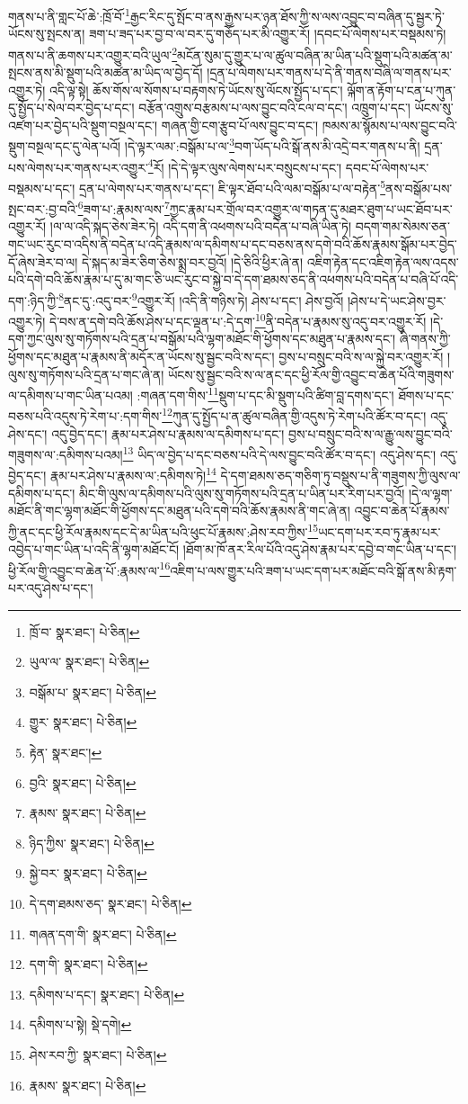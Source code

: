 གནས་པ་ནི་གླང་པོ་ཆེ་:ཁྲོ་བོ་\footnote{ཁྲོ་བ་  སྣར་ཐང་།  པེ་ཅིན། }རྒྱང་རིང་དུ་སྤོང་བ་ནས་རྒྱས་པར་ཉན་ཐོས་ཀྱི་ས་ལས་འབྱུང་བ་བཞིན་དུ་སྦྱར་ཏེ་ཡོངས་སུ་སྤངས་ན། ཟག་པ་ཟད་པར་བྱ་བ་ལ་བར་དུ་གཅོད་པར་མི་འགྱུར་རོ། །དབང་པོ་ལེགས་པར་བསྡམས་ཏེ། གནས་པ་ནི་ཆགས་པར་འགྱུར་བའི་ཡུལ་\footnote{ཡུལ་ལ་  སྣར་ཐང་།  པེ་ཅིན། }མངོན་སུམ་དུ་གྱུར་པ་ལ་ཚུལ་བཞིན་མ་ཡིན་པའི་སྡུག་པའི་མཚན་མ་སྤངས་ནས་མི་སྡུག་པའི་མཚན་མ་ཡིད་ལ་བྱེད་དོ། །དྲན་པ་ལེགས་པར་གནས་པ་དེ་ནི་གནས་བཞི་ལ་གནས་པར་འགྱུར་ཏེ། འདི་ལྟ་སྟེ། ཆོས་གོས་ལ་སོགས་པ་བརྟགས་ཏེ་ཡོངས་སུ་ལོངས་སྤྱོད་པ་དང་། ལྐོག་ན་རྟོག་པ་ངན་པ་ཀུན་དུ་སྤྱོད་པ་སེལ་བར་བྱེད་པ་དང་། བརྩོན་འགྲུས་བརྩམས་པ་ལས་བྱུང་བའི་ངལ་བ་དང་། འཁྲུག་པ་དང་། ཡོངས་སུ་འཛག་པར་བྱེད་པའི་སྡུག་བསྔལ་དང་། གཞན་གྱི་ངག་རྩུབ་པོ་ལས་བྱུང་བ་དང་། ཁམས་མ་སྙོམས་པ་ལས་བྱུང་བའི་སྡུག་བསྔལ་དང་དུ་ལེན་པའོ། །དེ་ལྟར་ལམ་:བསྒོམ་པ་ལ་\footnote{བསྒོམ་པ་  སྣར་ཐང་།  པེ་ཅིན། }བག་ཡོད་པའི་སྒོ་ནས་མི་འདྲེ་བར་གནས་པ་ནི། དྲན་པས་ལེགས་པར་གནས་པར་འགྱུར་\footnote{གྱུར་  སྣར་ཐང་།  པེ་ཅིན། }རོ། །དེ་དེ་ལྟར་ལུས་ལེགས་པར་བསྲུངས་པ་དང་། དབང་པོ་ལེགས་པར་བསྡམས་པ་དང་། དྲན་པ་ལེགས་པར་གནས་པ་དང་། ཇི་ལྟར་ཐོབ་པའི་ལམ་བསྒོམ་པ་ལ་བརྟེན་\footnote{རྟེན་  སྣར་ཐང་། }ནས་བསྒོམ་པས་སྤང་བར་:བྱ་བའི་\footnote{བྱའི་  སྣར་ཐང་།  པེ་ཅིན། }ཟག་པ་:རྣམས་ལས་\footnote{རྣམས་  སྣར་ཐང་།  པེ་ཅིན། }ཀྱང་རྣམ་པར་གྲོལ་བར་འགྱུར་ལ་གཏན་དུ་མཐར་ཐུག་པ་ཡང་ཐོབ་པར་འགྱུར་རོ། །ལ་ལ་འདི་སྐད་ཅེས་ཟེར་ཏེ། འདི་དག་ནི་འཕགས་པའི་བདེན་པ་བཞི་ཡིན་ཏེ། བདག་གམ་སེམས་ཅན་གང་ཡང་རུང་བ་འདིས་ནི་བདེན་པ་འདི་རྣམས་ལ་དམིགས་པ་དང་བཅས་ནས་དགེ་བའི་ཆོས་རྣམས་སྒོམ་པར་བྱེད་དོ་ཞེས་ཟེར་བ་ལ། དེ་སྐད་མ་ཟེར་ཅིག་ཅེས་སྨྲ་བར་བྱའོ། །དེ་ཅིའི་ཕྱིར་ཞེ་ན། འཇིག་རྟེན་དང་འཇིག་རྟེན་ལས་འདས་པའི་དགེ་བའི་ཆོས་རྣམ་པ་དུ་མ་གང་ཅི་ཡང་རུང་བ་སྐྱེ་བ་དེ་དག་ཐམས་ཅད་ནི་འཕགས་པའི་བདེན་པ་བཞི་པོ་འདི་དག་:ཉིད་ཀྱི་\footnote{ཉིད་ཀྱིས་  སྣར་ཐང་།  པེ་ཅིན། }ནང་དུ་:འདུ་བར་\footnote{སྐྱེ་བར་  སྣར་ཐང་།  པེ་ཅིན། }འགྱུར་རོ། །འདི་ནི་གཉིས་ཏེ། ཤེས་པ་དང་། ཤེས་བྱའོ། །ཤེས་པ་དེ་ཡང་ཤེས་བྱར་འགྱུར་ཏེ། དེ་བས་ན་དགེ་བའི་ཆོས་ཤེས་པ་དང་ལྡན་པ་:དེ་དག་\footnote{དེ་དག་ཐམས་ཅད་  སྣར་ཐང་།  པེ་ཅིན། }ནི་བདེན་པ་རྣམས་སུ་འདུ་བར་འགྱུར་རོ། །དེ་དག་ཀྱང་ལུས་སུ་གཏོགས་པའི་དྲན་པ་བསྒོམ་པའི་ལྷག་མཐོང་གི་ཕྱོགས་དང་མཐུན་པ་རྣམས་དང་། ཞི་གནས་ཀྱི་ཕྱོགས་དང་མཐུན་པ་རྣམས་ནི་མདོར་ན་ཡོངས་སུ་སྦྱང་བའི་ས་དང་། བྱས་པ་བསྲུང་བའི་ས་ལ་སྐྱེ་བར་འགྱུར་རོ། །ལུས་སུ་གཏོགས་པའི་དྲན་པ་གང་ཞེ་ན། ཡོངས་སུ་སྦྱང་བའི་ས་ལ་ནང་དང་ཕྱི་རོལ་གྱི་འབྱུང་བ་ཆེན་པོའི་གཟུགས་ལ་དམིགས་པ་གང་ཡིན་པའམ། :གཞན་དག་གིས་\footnote{གཞན་དག་གི་  སྣར་ཐང་།  པེ་ཅིན། }སྡུག་པ་དང་མི་སྡུག་པའི་ཚིག་བླ་དགས་དང་། ཐོགས་པ་དང་བཅས་པའི་འདུས་ཏེ་རེག་པ་:དག་གིས་\footnote{དག་གི་  སྣར་ཐང་།  པེ་ཅིན། }ཀུན་དུ་སྤྱོད་པ་ན་ཚུལ་བཞིན་གྱི་འདུས་ཏེ་རེག་པའི་ཚོར་བ་དང་། འདུ་ཤེས་དང་། འདུ་བྱེད་དང་། རྣམ་པར་ཤེས་པ་རྣམས་ལ་དམིགས་པ་དང་། བྱས་པ་བསྲུང་བའི་ས་ལ་རྒྱུ་ལས་བྱུང་བའི་གཟུགས་ལ་:དམིགས་པའམ།\footnote{དམིགས་པ་དང་།  སྣར་ཐང་།  པེ་ཅིན། } ཡིད་ལ་བྱེད་པ་དང་བཅས་པའི་དེ་ལས་བྱུང་བའི་ཚོར་བ་དང་། འདུ་ཤེས་དང་། འདུ་བྱེད་དང་། རྣམ་པར་ཤེས་པ་རྣམས་ལ་:དམིགས་ཏེ།\footnote{དམིགས་པ་སྟེ།  སྡེ་དགེ། } དེ་དག་ཐམས་ཅད་གཅིག་ཏུ་བསྡུས་པ་ནི་གཟུགས་ཀྱི་ལུས་ལ་དམིགས་པ་དང་། མིང་གི་ལུས་ལ་དམིགས་པའི་ལུས་སུ་གཏོགས་པའི་དྲན་པ་ཡིན་པར་རིག་པར་བྱའོ། །དེ་ལ་ལྷག་མཐོང་ནི་གང་ལྷག་མཐོང་གི་ཕྱོགས་དང་མཐུན་པའི་དགེ་བའི་ཆོས་རྣམས་ནི་གང་ཞེ་ན། འབྱུང་བ་ཆེན་པོ་རྣམས་ཀྱི་ནང་དང་ཕྱི་རོལ་རྣམས་དང་དེ་མ་ཡིན་པའི་ཕུང་པོ་རྣམས་:ཤེས་རབ་ཀྱིས་\footnote{ཤེས་རབ་ཀྱི་  སྣར་ཐང་།  པེ་ཅིན། }ཡང་དག་པར་རབ་ཏུ་རྣམ་པར་འབྱེད་པ་གང་ཡིན་པ་འདི་ནི་ལྷག་མཐོང་ངོ། །ཐོག་མ་ཁོ་ནར་རིལ་པོའི་འདུ་ཤེས་རྣམ་པར་དབྱེ་བ་གང་ཡིན་པ་དང་། ཕྱི་རོལ་གྱི་འབྱུང་བ་ཆེན་པོ་:རྣམས་ལ་\footnote{རྣམས་  སྣར་ཐང་།  པེ་ཅིན། }འཇིག་པ་ལས་གྱུར་པའི་ཟག་པ་ཡང་དག་པར་མཐོང་བའི་སྒོ་ནས་མི་རྟག་པར་འདུ་ཤེས་པ་དང་། 